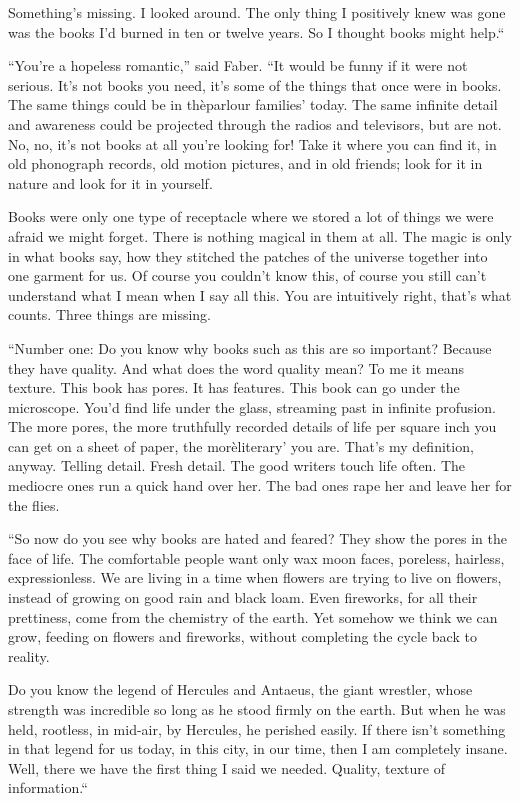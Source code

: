 \documentclass[11pt,openany]{book}
\begin{document}
Something's missing. I looked around. The only thing I positively knew was gone was the books I'd burned in ten or twelve years. So I thought books might help.``

``You're a hopeless romantic,'' said Faber. ``It would be funny if it were not serious. It's not books you need, it's some of the things that once were in books. The same things could be in thèparlour families' today. The same infinite detail and awareness could be projected through the radios and televisors, but are not. No, no, it's not books at all you're looking for! Take it where you can find it, in old phonograph records, old motion pictures, and in old friends; look for it in nature and look for it in yourself.

Books were only one type of receptacle where we stored a lot of things we were afraid we might forget. There is nothing magical in them at all. The magic is only in what books say, how they stitched the patches of the universe together into one garment for us. Of course you couldn't know this, of course you still can't understand what I mean when I say all this. You are intuitively right, that's what counts. Three things are missing.

``Number one: Do you know why books such as this are so important? Because they have quality. And what does the word quality mean? To me it means texture. This book has pores. It has features. This book can go under the microscope. You'd find life under the glass, streaming past in infinite profusion. The more pores, the more truthfully recorded details of life per square inch you can get on a sheet of paper, the morèliterary' you are. That's my definition, anyway. Telling detail. Fresh detail. The good writers touch life often. The mediocre ones run a quick hand over her. The bad ones rape her and leave her for the flies.

``So now do you see why books are hated and feared? They show the pores in the face of life. The comfortable people want only wax moon faces, poreless, hairless, expressionless. We are living in a time when flowers are trying to live on flowers, instead of growing on good rain and black loam. Even fireworks, for all their prettiness, come from the chemistry of the earth. Yet somehow we think we can grow, feeding on flowers and fireworks, without completing the cycle back to reality.

Do you know the legend of Hercules and Antaeus, the giant wrestler, whose strength was incredible so long as he stood firmly on the earth. But when he was held, rootless, in mid-air, by Hercules, he perished easily. If there isn't something in that legend for us today, in this city, in our time, then I am completely insane. Well, there we have the first thing I said we needed. Quality, texture of information.``
\end{document}
